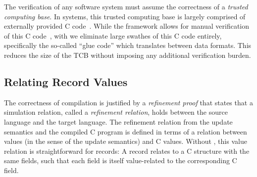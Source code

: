 The verification of any software system must assume the correctness of a 
\emph{trusted computing base}. In \cogent systems, this trusted computing base is largely
comprised of externally provided C code~\citep{OConnor:2016}. While the
\cogent framework allows for manual verification of this C 
code~\citep{Cheung_OR_22}, with \dargent we eliminate large swathes of this C code entirely, specifically the so-called ``glue code'' which translates between data formats. This reduces the size of the TCB without imposing any additional verification burden.
 






\subsection{Relating Record Values}\label{ssec:record-value-rel}

The correctness of compilation is justified by a \emph{refinement proof} that states that a simulation relation, called a \emph{refinement relation}, holds between the source language and the target language.
The refinement relation from the \cogent update semantics 
and the compiled C program is defined in terms of a relation between
\cogent values (in the sense of the update semantics)
and C values. 
Without \Dargent, this value
relation is straightforward for records: A \cogent record relates to a C structure with the same fields, such that each \cogent field is itself value-related to 
the corresponding C field.

